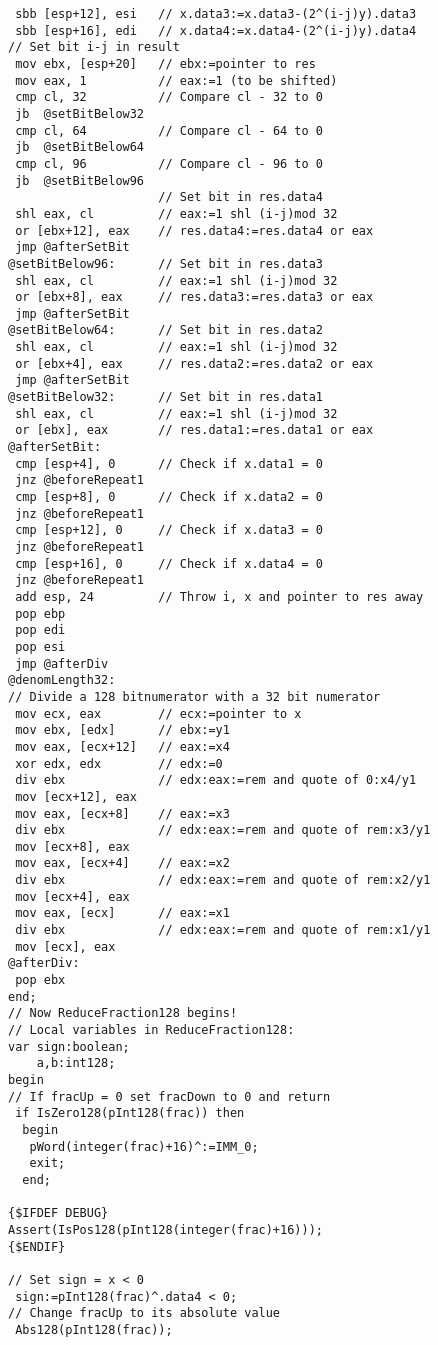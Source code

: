 \begin{multicols}{2}
{\begin{verbatim}
 sbb [esp+12], esi   // x.data3:=x.data3-(2^(i-j)y).data3
 sbb [esp+16], edi   // x.data4:=x.data4-(2^(i-j)y).data4
// Set bit i-j in result
 mov ebx, [esp+20]   // ebx:=pointer to res
 mov eax, 1          // eax:=1 (to be shifted)
 cmp cl, 32          // Compare cl - 32 to 0
 jb  @setBitBelow32
 cmp cl, 64          // Compare cl - 64 to 0
 jb  @setBitBelow64
 cmp cl, 96          // Compare cl - 96 to 0
 jb  @setBitBelow96
                     // Set bit in res.data4
 shl eax, cl         // eax:=1 shl (i-j)mod 32
 or [ebx+12], eax    // res.data4:=res.data4 or eax
 jmp @afterSetBit
@setBitBelow96:      // Set bit in res.data3
 shl eax, cl         // eax:=1 shl (i-j)mod 32
 or [ebx+8], eax     // res.data3:=res.data3 or eax
 jmp @afterSetBit
@setBitBelow64:      // Set bit in res.data2
 shl eax, cl         // eax:=1 shl (i-j)mod 32
 or [ebx+4], eax     // res.data2:=res.data2 or eax
 jmp @afterSetBit
@setBitBelow32:      // Set bit in res.data1
 shl eax, cl         // eax:=1 shl (i-j)mod 32
 or [ebx], eax       // res.data1:=res.data1 or eax
@afterSetBit:
 cmp [esp+4], 0      // Check if x.data1 = 0
 jnz @beforeRepeat1
 cmp [esp+8], 0      // Check if x.data2 = 0
 jnz @beforeRepeat1
 cmp [esp+12], 0     // Check if x.data3 = 0
 jnz @beforeRepeat1
 cmp [esp+16], 0     // Check if x.data4 = 0
 jnz @beforeRepeat1
 add esp, 24         // Throw i, x and pointer to res away
 pop ebp
 pop edi
 pop esi
 jmp @afterDiv
@denomLength32:
// Divide a 128 bitnumerator with a 32 bit numerator
 mov ecx, eax        // ecx:=pointer to x
 mov ebx, [edx]      // ebx:=y1
 mov eax, [ecx+12]   // eax:=x4
 xor edx, edx        // edx:=0
 div ebx             // edx:eax:=rem and quote of 0:x4/y1
 mov [ecx+12], eax    
 mov eax, [ecx+8]    // eax:=x3
 div ebx             // edx:eax:=rem and quote of rem:x3/y1
 mov [ecx+8], eax
 mov eax, [ecx+4]    // eax:=x2
 div ebx             // edx:eax:=rem and quote of rem:x2/y1
 mov [ecx+4], eax
 mov eax, [ecx]      // eax:=x1
 div ebx             // edx:eax:=rem and quote of rem:x1/y1
 mov [ecx], eax
@afterDiv:
 pop ebx
end;
// Now ReduceFraction128 begins!
// Local variables in ReduceFraction128:
var sign:boolean;
    a,b:int128;
begin
// If fracUp = 0 set fracDown to 0 and return
 if IsZero128(pInt128(frac)) then
  begin
   pWord(integer(frac)+16)^:=IMM_0;
   exit;
  end;

{$IFDEF DEBUG}
Assert(IsPos128(pInt128(integer(frac)+16)));
{$ENDIF}

// Set sign = x < 0 
 sign:=pInt128(frac)^.data4 < 0;
// Change fracUp to its absolute value
 Abs128(pInt128(frac));


\end{verbatim}}
\end{multicols}
